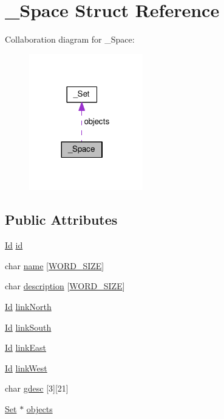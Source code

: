 \hypertarget{struct__Space}{\section{\+\_\+\+Space Struct Reference}
\label{struct__Space}
}


Collaboration diagram for \+\_\+\+Space\+:\nopagebreak
\begin{figure}[H]
\begin{center}
\leavevmode
\includegraphics[width=140pt]{struct__Space__coll__graph}
\end{center}
\end{figure}
\subsection*{Public Attributes}
\begin{DoxyCompactItemize}
\item 
\hyperlink{types_8h_a845e604fb28f7e3d97549da3448149d3}{Id} \hyperlink{struct__Space_a70cb461deb9ac073e401b607339b567f}{id}
\item 
char \hyperlink{struct__Space_a4e8775f2ba9ae19392f9942dbb5f5ec0}{name} \mbox{[}\hyperlink{types_8h_a92ed8507d1cd2331ad09275c5c4c1c89}{W\+O\+R\+D\+\_\+\+S\+I\+Z\+E}\mbox{]}
\item 
char \hyperlink{struct__Space_a2a50aacb78d1d0f65f5b14f94ed81d80}{description} \mbox{[}\hyperlink{types_8h_a92ed8507d1cd2331ad09275c5c4c1c89}{W\+O\+R\+D\+\_\+\+S\+I\+Z\+E}\mbox{]}
\item 
\hyperlink{types_8h_a845e604fb28f7e3d97549da3448149d3}{Id} \hyperlink{struct__Space_a3f2998ecc940b5cdab73e38188886902}{link\+North}
\item 
\hyperlink{types_8h_a845e604fb28f7e3d97549da3448149d3}{Id} \hyperlink{struct__Space_a642c37093a6ccc0203a655c3fc0a93d3}{link\+South}
\item 
\hyperlink{types_8h_a845e604fb28f7e3d97549da3448149d3}{Id} \hyperlink{struct__Space_adbf9d4d57d188ef48d3e361fb77a92cf}{link\+East}
\item 
\hyperlink{types_8h_a845e604fb28f7e3d97549da3448149d3}{Id} \hyperlink{struct__Space_aaa6f5fa10a67afc466e3b272099dc398}{link\+West}
\item 
char \hyperlink{struct__Space_a0a71c4c0a4a1698f7d860ba5b80beb7f}{gdesc} \mbox{[}3\mbox{]}\mbox{[}21\mbox{]}
\item 
\hyperlink{set_8h_a6d3b7f7c92cbb4577ef3ef7ddbf93161}{Set} $\ast$ \hyperlink{struct__Space_a661ed8b0fc8085b6db70188aa5085625}{objects}
\end{DoxyCompactItemize}


